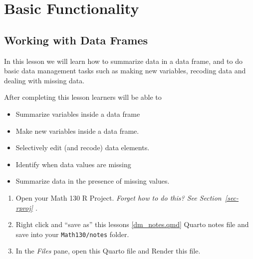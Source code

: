 \documentclass[
  letterpaper,
  DIV=11,
  numbers=noendperiod,
  oneside]{scrreprt}
\providecommand{\tightlist}{%
  \setlength{\itemsep}{0pt}\setlength{\parskip}{0pt}}\usepackage{longtable,booktabs,array}
\begin{document}
\part{Basic Functionality}

\chapter{Working with Data Frames}\label{sec-dm}

In this lesson we will learn how to summarize data in a data frame, and
to do basic data management tasks such as making new variables, recoding
data and dealing with missing data.

\begin{tcolorbox}[enhanced jigsaw, bottomrule=.15mm, colback=white, colframe=quarto-callout-note-color-frame, toprule=.15mm, coltitle=black, rightrule=.15mm, opacitybacktitle=0.6, colbacktitle=quarto-callout-note-color!10!white, toptitle=1mm, leftrule=.75mm, breakable, bottomtitle=1mm, titlerule=0mm, title={🎓 Learning Objectives}, arc=.35mm, left=2mm, opacityback=0]

After completing this lesson learners will be able to

\begin{itemize}
\tightlist
\item
  Summarize variables inside a data frame
\item
  Make new variables inside a data frame.
\item
  Selectively edit (and recode) data elements.
\item
  Identify when data values are missing
\item
  Summarize data in the presence of missing values.
\end{itemize}

\end{tcolorbox}

\begin{tcolorbox}[enhanced jigsaw, bottomrule=.15mm, colback=white, colframe=quarto-callout-tip-color-frame, toprule=.15mm, coltitle=black, rightrule=.15mm, opacitybacktitle=0.6, colbacktitle=quarto-callout-tip-color!10!white, toptitle=1mm, leftrule=.75mm, breakable, bottomtitle=1mm, titlerule=0mm, title={👉 Prepare}, arc=.35mm, left=2mm, opacityback=0]

\begin{enumerate}
\def\labelenumi{\arabic{enumi}.}
\tightlist
\item
  Open your Math 130 R Project. \emph{Forget how to do this? See
  Section~\ref{sec-rproj} .}
\item
  Right click and ``save as'' this lessons
  \href{notes/dm_notes.qmd}{{[}dm\_notes.qmd{]}} Quarto notes file and
  save into your \texttt{Math130/notes} folder.
\item
  In the \emph{Files} pane, open this Quarto file and Render this file.
\end{enumerate}

\end{tcolorbox}
\end{document}
